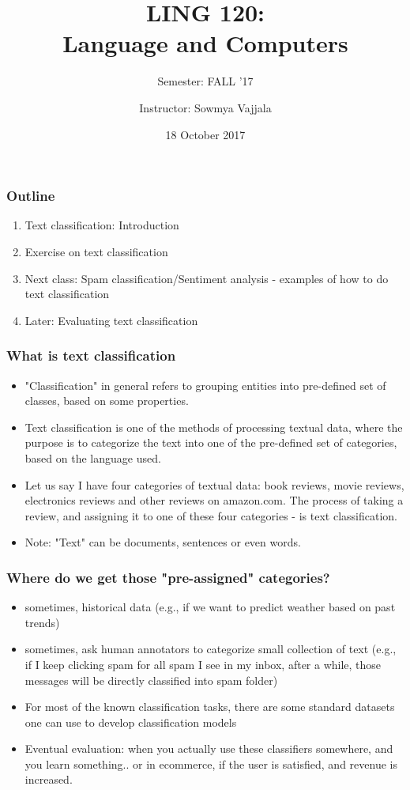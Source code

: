 \documentclass{beamer}
\author[Sowmya Vajjala]{Instructor: Sowmya Vajjala}
\title[LING 120]{LING 120: \\ Language and Computers}
\subtitle{Semester: FALL '17}
\date{18 October 2017}
\institute{Iowa State University, USA}
\begin{document}
\begin{frame}\titlepage
\end{frame}

\begin{frame}
\frametitle{Outline}
\begin{enumerate}
\item Text classification: Introduction
\item Exercise on text classification %
\item Next class: Spam classification/Sentiment analysis - examples of how to do text classification
\item Later: Evaluating text classification
\end{enumerate}
\end{frame}

\begin{frame}
\frametitle{What is text classification}
\begin{itemize}
\item "Classification" in general refers to grouping entities into pre-defined set of classes, based on some properties. \pause 
\item Text classification is one of the methods of processing textual data, where the purpose is to categorize the text into one of the pre-defined set of categories, based on the language used. \pause
\item Let us say I have four categories of textual data: book reviews, movie reviews, electronics reviews and other reviews on amazon.com. The process of taking a review, and assigning it to one of these four categories - is text classification. 
\item Note: "Text" can be documents, sentences or even words.
\end{itemize}
\end{frame}

\begin{frame}
\frametitle{Where do we get those "pre-assigned" categories?}
\begin{itemize}
\item sometimes, historical data (e.g., if we want to predict weather based on past trends) \pause
\item sometimes, ask human annotators to categorize small collection of text (e.g., if I keep clicking spam for all spam I see in my inbox, after a while, those messages will be directly classified into spam folder) \pause
\item For most of the known classification tasks, there are some standard datasets one can use to develop classification models
\item Eventual evaluation: when you actually use these classifiers somewhere, and you learn something.. or in ecommerce, if the user is satisfied, and revenue is increased.
\end{itemize}
\end{frame}
\end{document}
